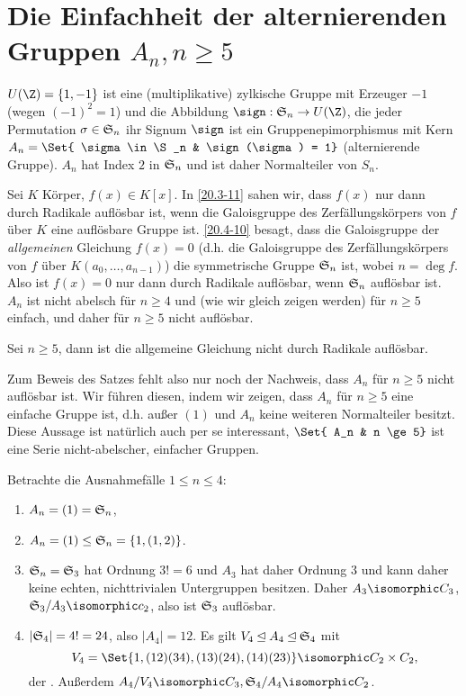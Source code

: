 
\section{Die Einfachheit der alternierenden Gruppen \texorpdfstring{$A_n, n \ge 5$}{Aₙ, n≥5}}

$U(\Z) = \{1, -1\}$ ist eine (multiplikative) zylkische Gruppe mit Erzeuger $-1$ (wegen $(-1)^2 = 1$) und die Abbildung $\sign: \S_n \to U(\Z)$, die jeder Permutation $\sigma \in \S_n$ ihr Signum $\sign$ ist ein Gruppenepimorphismus mit Kern $A_n = \Set{ \sigma \in \S_n & \sign(\sigma) = 1}$ (alternierende Gruppe).
$A_n$ hat Index $2$ in $\S_n$ und ist daher Normalteiler von $S_n$.

Sei $K$ Körper, $f(x) \in K[x]$.
In \ref{20.3-11} sahen wir, dass $f(x)$ nur dann durch Radikale auflösbar ist, wenn die Galoisgruppe des Zerfällungskörpers von $f$ über $K$ eine auflösbare Gruppe ist.
\ref{20.4-10} besagt, dass die Galoisgruppe der \emph{allgemeinen} Gleichung $f(x) = 0$ (d.h. die Galoisgruppe des Zerfällungskörpers von $f$ über $K(a_0, \dotsc, a_{n-1})$) die symmetrische Gruppe $\S_n$ ist, wobei $n = \deg f$.
Also ist $f(x) = 0$ nur dann durch Radikale auflösbar, wenn $\S_n$ auflösbar ist.
$A_n$ ist nicht abelsch für $n \ge 4$ und (wie wir gleich zeigen werden) für $n \ge 5$ einfach, und daher für $n \ge 5$ nicht auflösbar.

\begin{st} \label{20.5-1}
	Sei $n \ge 5$, dann ist die allgemeine Gleichung nicht durch Radikale auflösbar.
\end{st}

Zum Beweis des Satzes fehlt also nur noch der Nachweis, dass $A_n$ für $n \ge 5$ nicht auflösbar ist.
Wir führen diesen, indem wir zeigen, dass $A_n$ für $n \ge 5$ eine einfache Gruppe ist, d.h. außer $(1)$ und $A_n$ keine weiteren Normalteiler besitzt.
Diese Aussage ist natürlich auch per se interessant, $\Set{ A_n & n \ge 5}$ ist eine Serie nicht-abelscher, einfacher Gruppen.


\begin{nt} \label{20.5-2}
	Betrachte die Ausnahmefälle $1 \le n \le 4$:
	\begin{enumerate}[label={$n=\arabic*$:},leftmargin=4em]
		\item
			$A_n = (1) = \S_n$,
		\item
			$A_n = (1) \le \S_n = \{1, (1,2) \}$.
		\item
			$\S_n = \S_3$ hat Ordnung $3! = 6$ und $A_3$ hat daher Ordnung $3$ und kann daher keine echten, nichttrivialen Untergruppen besitzen.
			Daher $A_3 \isomorphic C_3$, $\S_3 / A_3 \isomorphic c_2$, also ist $\S_3$ auflösbar.
		\item
			$|\S_4| = 4! = 24$, also $|A_4| = 12$.
			Es gilt $V_4 \NormalDivisor A_4 \NormalDivisor \S_4$ mit
			\[
				V_4 = \Set{ 1, (12)(34), (13)(24), (14)(23) } \isomorphic C_2 \times C_2,
			\]
			der .
			Außerdem $A_4 / V_4 \isomorphic C_3, \S_4 / A_4 \isomorphic C_2$.
	\end{enumerate}
\end{nt}

